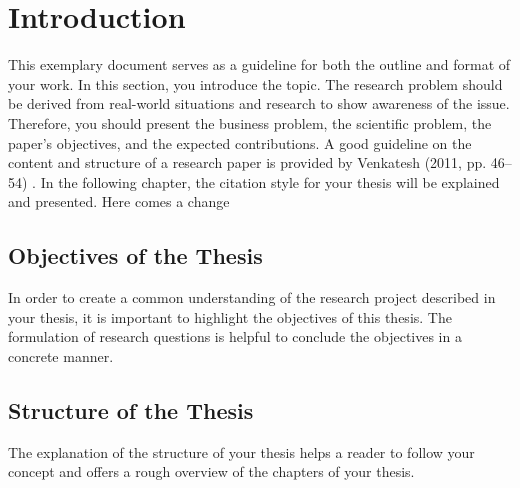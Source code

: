 \chapter{Introduction}

This exemplary document serves as a guideline for both the outline and format of your work. In this section, you introduce the topic. The research problem should be derived from real-world situations and research to show awareness of the issue. Therefore, you should present the business problem, the scientific problem, the paper’s objectives, and the expected contributions. A good guideline on the content and structure of a research paper is provided by Venkatesh (2011, pp. 46–54) \cite{tannenbaum}. In the following chapter, the citation style for your thesis will be explained and presented. Here comes a change

\section{Objectives of the Thesis}
\hspace{1cm}
In order to create a common understanding of the research project described in your thesis, it is important to highlight the objectives of this thesis. The formulation of research questions is helpful to conclude the objectives in a concrete manner.
\section{Structure of the Thesis}
The explanation of the structure of your thesis helps a reader to follow your concept and offers a rough overview of the chapters of your thesis.